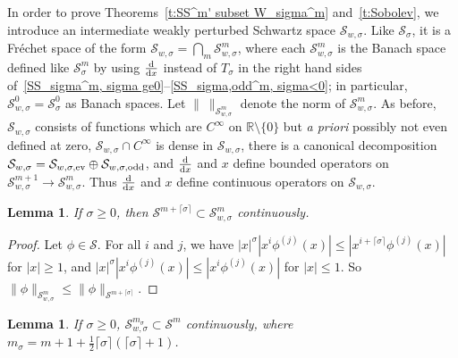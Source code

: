 \documentclass[11pt]{article}
\newtheorem{Lemma}[Theorem]{Lemma}
\newcommand{\R}{\mathbb{R}}
\renewcommand{\SS}{\mathcal{S}}
\newcommand{\Cinf}{C^\infty}
\begin{document}
In order to prove Theorems~\ref{t:SS^m' subset W_sigma^m} and~\ref{t:Sobolev}, we introduce an intermediate
weakly perturbed Schwartz space $\SS_{w,\sigma}$. Like $\SS_\sigma$, it is a Fr\'echet space of the form $\SS_{w,\sigma}=\bigcap_m\SS_{w,\sigma}^m$, where each $\SS_{w,\sigma}^m$ is the Banach space def\/ined like $\SS_\sigma^m$ by using  $\frac{{\rm d}}{{\rm d}x}$ instead of $T_\sigma$ in the right hand sides of~\mbox{\eqref{SS_sigma^m, sigma ge0}--\eqref{SS_sigma,odd^m, sigma<0}}; in particular, $\SS_{w,\sigma}^0=\SS_\sigma^0$ as Banach spaces. Let $\|\ \|_{\SS_{w,\sigma}^m}$ denote the norm of $\SS_{w,\sigma}^m$. As before, $\SS_{w,\sigma}$ consists of functions which are $\Cinf$ on $\R\setminus\{0\}$ but \textit{a priori} possibly not even def\/ined at zero, $\SS_{w,\sigma}\cap\Cinf$ is dense in $\SS_{w,\sigma}$, there is a canonical decomposition $\SS_{w,\sigma}=\SS_{w,\sigma,\text{\rm ev}}\oplus\SS_{w,\sigma,\text{\rm odd}}$, and $\frac{{\rm d}}{{\rm d}x}$ and $x$ def\/ine bounded operators on $\SS_{w,\sigma}^{m+1}\to\SS_{w,\sigma}^m$. Thus  $\frac{{\rm d}}{{\rm d}x}$ and $x$ def\/ine continuous operators on $\SS_{w,\sigma}$.

\begin{Lemma}\label{l:SS m+lceil sigma/2 rceil subset SS w,sigma m}
  If $\sigma\ge0$, then $\SS^{m+\lceil\sigma\rceil}\subset\SS_{w,\sigma}^m$ continuously.
\end{Lemma}

\begin{proof}
  Let $\phi\in\SS$. For all $i$ and $j$, we have $|x|^\sigma|x^i\phi^{(j)}(x)|\le|x^{i+\lceil\sigma\rceil}\phi^{(j)}(x)|$ for $|x|\ge1$, and $|x|^\sigma|x^i\phi^{(j)}(x)|\le|x^i\phi^{(j)}(x)|$ for $|x|\le1$. So $\|\phi\|_{\SS_{w,\sigma}^m}\le\|\phi\|_{\SS^{m+\lceil\sigma\rceil}}$.
\end{proof}

\begin{Lemma}\label{l:SS_w,sigma^m' subset SS^m}
  If $\sigma\ge0$, $\SS_{w,\sigma}^{m_\sigma}\subset\SS^m$ continuously, where $m_\sigma=m+1+\frac{1}{2}\lceil\sigma\rceil(\lceil\sigma\rceil+1)$.
\end{Lemma}
\end{document}
